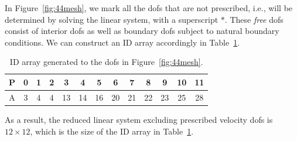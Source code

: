 In Figure~\ref{fig:44mesh},
we mark all the
dofs that are not prescribed, i.e., will be determined by 
solving the linear system, with a superscript $*$.
These \textit{free} dofs consist of interior dofs as well as boundary dofs subject to
natural boundary conditions.
We can construct an ID array accordingly in Table~\ref{tab:IDarray}.
\begin{table}[ht]
\centering
		  \begin{tabular}{|c|c|c|c|c|c|c|c|c|c|c|c|c|}
					 \hline
					 P & 0 & 1 & 2 & 3  & 4  & 5  & 6  & 7  & 8  & 9  & 10 & 11\\
					 \hline
					 A & 3 & 4 & 4 & 13 & 14 & 16 & 20 & 21 & 22 & 23 & 25 & 28\\
					 \hline
		  \end{tabular}
		  \caption[ID array]{ID array generated to the dofs in Figure~\ref{fig:44mesh}.}
		  \label{tab:IDarray}
\end{table}
As a result, the reduced linear system excluding prescribed velocity dofs is $12 \times 12$,
which is the size of the ID array in Table~\ref{tab:IDarray}.
